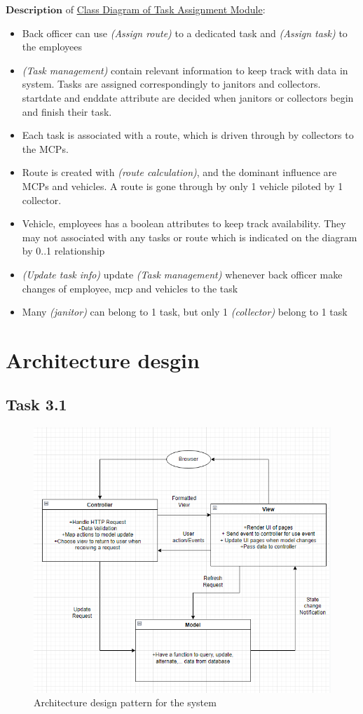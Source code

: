 \documentclass[a4paper]{article}
\begin{document}
$\textbf{Description}$ of \hyperlink{class}{Class Diagram of Task Assignment Module}:
\begin{itemize}
    \item Back officer can use \textit{(Assign route)} to a dedicated task and \textit{(Assign task)} to the employees
    \item \textit{(Task management)} contain relevant information to keep track with data in system. Tasks are assigned correspondingly to janitors and collectors. startdate and enddate attribute are decided when janitors or collectors begin and finish their task.
    \item Each task is associated with a route, which is driven through by collectors to the MCPs.
    \item Route is created with \textit{(route calculation)}, and the dominant influence are MCPs and vehicles. A route is gone through by only 1 vehicle piloted by 1 collector.
    \item Vehicle, employees has a boolean attributes to keep track availability. They may not associated with any tasks or route which is indicated on the diagram by 0..1 relationship
    \item \textit{(Update task info)} update \textit{(Task management)} whenever back officer make changes of employee, mcp and vehicles to the task
    \item Many \textit{(janitor)} can belong to 1 task, but only 1 \textit{(collector)} belong to 1 task
\end{itemize}

\section{Architecture desgin}
\subsection{Task 3.1}

\begin{figure}
\centering
  \includegraphics[width=0.8\linewidth]{architecture approach.png}
  \hypertarget{MVC}{\caption{Architecture design pattern for the system}}
\end{figure}
\end{document}
